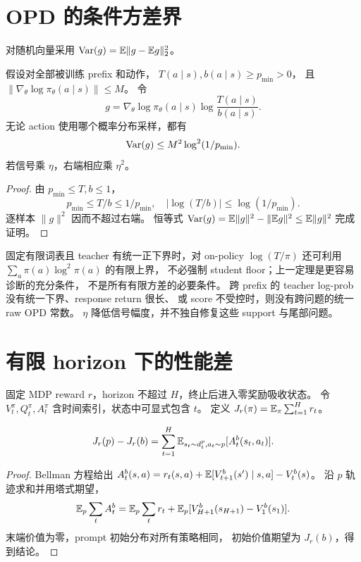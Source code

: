 \section{OPD 的条件方差界}
对随机向量采用 $\operatorname{Var}(g)=\mathbb{E}\|g-\mathbb{E} g\|_2^2$。
\begin{theorem}\label{thm:floor}
假设对全部被训练 prefix 和动作，
$T(a\mid s),b(a\mid s)\ge p_{\min}>0$，
且 $\|\nabla_\theta\log\pi_\theta(a\mid s)\|\le M$。
令
\[
 g=\nabla_\theta\log\pi_\theta(a\mid s)\log\frac{T(a\mid s)}{b(a\mid s)}.
\]
无论 action 使用哪个概率分布采样，都有
\[
 \operatorname{Var}(g)\le M^2\log^2(1/p_{\min}).
\]
若信号乘 $\eta$，右端相应乘 $\eta^2$。
\end{theorem}
\begin{proof}
由 $p_{\min}\le T,b\le1$，
\[
 p_{\min}\le T/b\le1/p_{\min},
 \quad|\log(T/b)|\le\log(1/p_{\min}).
\]
逐样本 $\|g\|^2$ 因而不超过右端。
恒等式
$\operatorname{Var}(g)=\mathbb{E}\|g\|^2-\|\mathbb{E} g\|^2\le\mathbb{E}\|g\|^2$ 完成证明。
\end{proof}

固定有限词表且 teacher 有统一正下界时，对 on-policy
$\log(T/\pi)$ 还可利用 $\sum_a\pi(a)\log^2\pi(a)$ 的有限上界，
不必强制 student floor；上一定理是更容易诊断的充分条件，
不是所有有限方差的必要条件。
跨 prefix 的 teacher log-prob 没有统一下界、response return 很长、
或 score 不受控时，则没有跨问题的统一 raw OPD 常数。
$\eta$ 降低信号幅度，并不独自修复这些 support 与尾部问题。

\section{有限 horizon 下的性能差}
固定 MDP reward $r$，horizon 不超过 $H$，终止后进入零奖励吸收状态。
令 $V^\pi_t,Q^\pi_t,A^\pi_t$ 含时间索引，状态中可显式包含 $t$。
定义 $J_r(\pi)=\mathbb{E}_\pi\sum_{t=1}^{H}r_t$。

\begin{lemma}\label{lem:pdl}
\[
 J_r(p)-J_r(b)=\sum_{t=1}^{H}
       \mathbb{E}_{s_t\sim d_t^p,a_t\sim p}[A^b_t(s_t,a_t)].
\]
\end{lemma}
\begin{proof}
Bellman 方程给出
$A^b_t(s,a)=r_t(s,a)+\mathbb{E}[V^b_{t+1}(s')\mid s,a]-V^b_t(s)$。
沿 $p$ 轨迹求和并用塔式期望，
\[
 \mathbb{E}_p\sum_t A^b_t
 =\mathbb{E}_p\sum_t r_t+\mathbb{E}_p[V^b_{H+1}(s_{H+1})-V^b_1(s_1)].
\]
末端价值为零，prompt 初始分布对所有策略相同，
初始价值期望为 $J_r(b)$，得到结论。
\end{proof}

